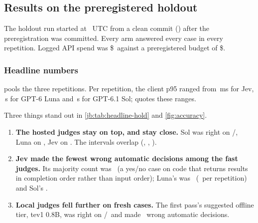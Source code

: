 \subsection{Results on the preregistered holdout \texorpdfstring{\prereg}{[preregistered]}}\label{jb:sec:holdout}

The holdout run started at \HoldStarted\ UTC from a clean commit (\code{\HoldCommit}) after the
preregistration was committed. Every arm answered every case in every repetition. Logged API spend was
\$\HoldSpendUSD\ against a preregistered budget of \$\HoldBudgetUSD.

\subsubsection{Headline numbers}

\begin{table}[tbp]
\centering\small
\caption{Holdout \prereg, \HoldN\ cases, \HoldReps\ repetitions, policy .
Same conventions as \cref{jb:tab:headline-dev}.}
\label{jb:tab:headline-hold}

\end{table}

 pools the three repetitions. Per repetition, the client p95 ranged from \JevHoldPninetyfiveRange\,ms for Jev, \LunaHoldPninetyfiveRangeS\,s for GPT-6 Luna and \SolHoldPninetyfiveRangeS\,s for GPT-6.1 Sol; \mainpaper{} quotes these ranges.



Three things stand out in \cref{jb:tab:headline-hold} and \cref{fig:accuracy}.
\begin{enumerate}
  \item \textbf{The hosted judges stay on top, and stay close.} Sol was right on \SolHoldAccK/\HoldN,
    Luna on \LunaHoldAccK, Jev on \JevHoldAccK. The intervals overlap
    (\SolHoldAccCI, \LunaHoldAccCI, \JevHoldAccCI).
  \item \textbf{Jev made the fewest wrong automatic decisions among the fast judges.} Its majority
    count was \JevHoldWaK\ (a yes/no case on code that returns results in completion order rather than
    input order); Luna's was \LunaHoldWaK\ (\LunaHoldWaRange\ per repetition) and Sol's \SolHoldWaK.
  \item \textbf{Local judges fell further on fresh cases.} The first pass's suggested offline tier,
    tev1 0.8B, was right on \TevPtEightHoldAccK/\HoldN\ and made \TevPtEightHoldWaK\ wrong automatic
    decisions.
\end{enumerate}

